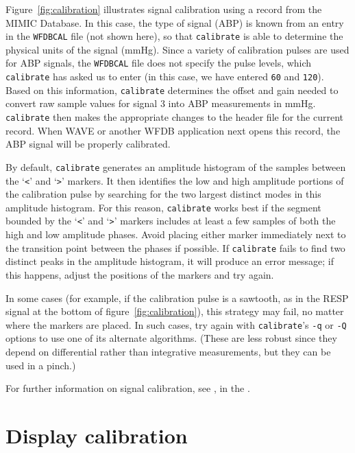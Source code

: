 \documentclass[twoside]{book}
\newcommand{\WAVE}{{\sf WAVE}\xspace}
\begin{document}
Figure~\ref{fig:calibration} illustrates signal calibration using a
record from the MIMIC Database.  In this case, the type of signal
(ABP) is known from an entry in the {\tt WFDBCAL} file (not shown here),
so that {\tt calibrate} is able to determine the physical units of the
signal (mmHg).  Since a variety of calibration pulses are used for ABP
signals, the {\tt WFDBCAL} file does not specify the pulse levels, which
{\tt calibrate} has asked us to enter (in this case, we have entered
{\tt 60} and {\tt 120}).  Based on this information, {\tt calibrate}
determines the offset and gain needed to convert raw sample values for
signal 3 into ABP measurements in mmHg.  {\tt calibrate} then makes
the appropriate changes to the header file for the current record.
When \WAVE{} or another WFDB application next opens this record, the ABP
signal will be properly calibrated.

By default, {\tt calibrate} generates an amplitude histogram of the
samples between the `{\tt <}' and `{\tt >}' markers.  It then
identifies the low and high amplitude portions of the calibration
pulse by searching for the two largest distinct modes in this
amplitude histogram.  For this reason, {\tt calibrate} works best if
the segment bounded by the `{\tt <}' and `{\tt >}' markers includes at
least a few samples of both the high and low amplitude phases.  Avoid
placing either marker immediately next to the transition point between
the phases if possible.  If {\tt calibrate} fails to find two distinct
peaks in the amplitude histogram, it will produce an error message;
if this happens, adjust the positions of the markers and try again.

In some cases (for example, if the calibration pulse is a sawtooth, as
in the RESP signal at the bottom of figure~\ref{fig:calibration}),
this strategy may fail, no matter where the markers are placed.  In
such cases, try again with {\tt calibrate}'s {\tt -q} or {\tt -Q}
options to use one of its alternate algorithms.  (These are less
robust since they depend on differential rather than integrative
measurements, but they can be used in a pinch.)

For further information on signal calibration, see 
,
in the
.

\section{Display calibration}
\end{document}
